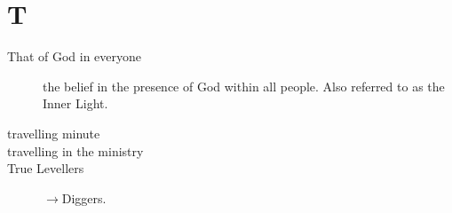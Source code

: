 \section*{T}

\articlesize

\begin{description}

 \item[That of God in everyone]
    the belief in the presence of God within all people. Also referred to as the Inner Light.

 \item[travelling minute]

 \item[travelling in the ministry]

 \item[True Levellers] $\to$Diggers.

 \end{description}

\normalsize
